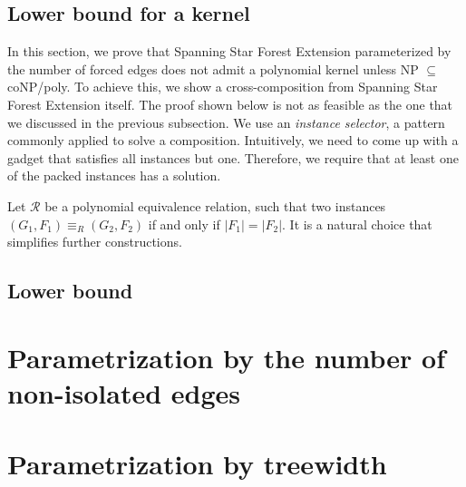 \documentclass[en]{pracamgr}
\newcommand{\ssfep}{{\sc Spanning Star Forest Extension}}
\begin{document}
\subsection{Lower bound for a kernel}

In this section, we prove that \ssfep{} parameterized by the number of forced edges does not admit a polynomial kernel unless NP $\subseteq$ coNP/poly. To achieve this, we show a cross-composition from \ssfep{} itself. The proof shown below is not as feasible as the one that we discussed in the previous subsection. We use an \emph{instance selector}, a pattern commonly applied to solve a composition. Intuitively, we need to come up with a gadget that satisfies all instances but one. Therefore, we require that at least one of the packed instances has a solution.

Let $\mathcal{R}$ be a polynomial equivalence relation, such that two instances $(G_1,F_1) \equiv_R (G_2, F_2)$ if and only if $|F_1| = |F_2|$. It is a natural choice that simplifies further constructions. 

\subsection{Lower bound}

\section{Parametrization by the number of non-isolated edges}

\section{Parametrization by treewidth}
\end{document}
